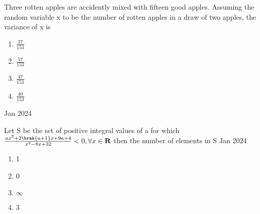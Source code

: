 \bigskip
\item Three rotten apples are accidently mixed with fifteen good apples. Assuming the random variable x to be the number of rotten apples in a draw of two apples, the variance of x is  
\begin{enumerate}
    \item $\frac{37}{153}$\\
    \item $\frac{57}{153}$\\
    \item $\frac{47}{153}$\\
    \item $\frac{40}{153}$
\end{enumerate} \hfill{Jan 2024}
\bigskip
\item Let S be the set of positive integral values of a for which $\frac{ax^2+2\brak{a+1}x+9a+4}{x^2-8x+32}<0,\forall x \in\mathbf{R}$ then the number of elements in  S \hfill{Jan 2024}
\begin{enumerate}
    \item 1
    \item 0
    \item $\infty$
    \item 3
\end{enumerate}


